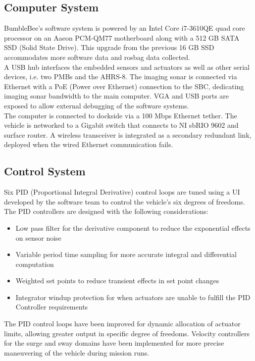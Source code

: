 \documentclass[journal,12pt]{IEEEtran}
\begin{document}
\subsection{Computer System}
BumbleBee's software system is powered by an Intel Core i7-3610QE quad core processor on an Aaeon PCM-QM77 motherboard along with a 512 GB SATA SSD (Solid State Drive). This upgrade from the previous 16 GB SSD accommodates more software data and rosbag data collected. \\

A USB hub interfaces the embedded sensors and actuators as well as other serial devices, i.e. two PMBs and the AHRS-8. The imaging sonar is connected via Ethernet with a PoE (Power over Ethernet) connection to the SBC, dedicating imaging sonar bandwidth to the main computer. VGA and USB ports are exposed to allow external debugging of the software systems. \\

The computer is connected to dockside via a 100 Mbps Ethernet tether. The vehicle is networked to a Gigabit switch that connects to NI sbRIO 9602 and surface router. A wireless transceiver is integrated as a secondary redundant link, deployed when the wired Ethernet communication fails. 

\subsection{Control System}
Six PID (Proportional Integral Derivative) control loops are tuned using a UI developed by the software team to control the vehicle's six degrees of freedoms. The PID controllers are designed with the following considerations:

\begin{itemize}
\item {Low pass filter for the derivative component to reduce the exponential effects on sensor noise}
\item {Variable period time sampling for more accurate integral and differential computation}
\item {Weighted set points to reduce transient effects in set point changes}
\item {Integrator windup protection for when actuators are unable to fulfill the PID Controller requirements \\ }
\end{itemize}

The PID control loops have been improved for dynamic allocation of actuator limits, allowing greater output in specific degree of freedoms. Velocity controllers for the surge and sway domains have been implemented for more precise maneuvering of the vehicle during mission runs.
\end{document}
